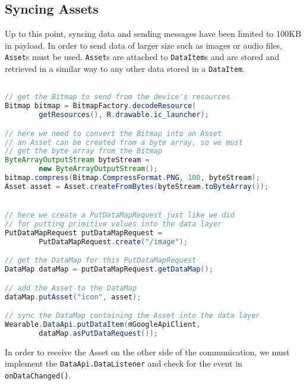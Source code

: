 
\subsection{Syncing Assets}
Up to this point, syncing data and sending messages have been limited to 100KB
in payload. In order to send data of larger size such as images or audio files,
\texttt{Asset}s must be used. \texttt{Asset}s are attached to
\texttt{DataItem}s and are stored and retrieved in a similar way to any other
data stored in a \texttt{DataItem}.

\begin{lstlisting}[language=Java]

// get the Bitmap to send from the device's resources
Bitmap bitmap = BitmapFactory.decodeResource(
        getResources(), R.drawable.ic_launcher);

// here we need to convert the Bitmap into an Asset
// an Asset can be created from a byte array, so we must
// get the byte array from the Bitmap
ByteArrayOutputStream byteStream =
        new ByteArrayOutputStream();
bitmap.compress(Bitmap.CompressFormat.PNG, 100, byteStream);
Asset asset = Asset.createFromBytes(byteStream.toByteArray());


// here we create a PutDataMapRequest just like we did
// for putting primitive values into the data layer
PutDataMapRequest putDataMapRequest =
        PutDataMapRequest.create("/image");

// get the DataMap for this PutDataMapRequest
DataMap dataMap = putDataMapRequest.getDataMap();

// add the Asset to the DataMap
dataMap.putAsset("icon", asset);

// sync the DataMap containing the Asset into the data layer
Wearable.DataApi.putDataItem(mGoogleApiClient,
        dataMap.asPutDataRequest());

\end{lstlisting}

In order to receive the Asset on the other side of the communication, we must
implement the \texttt{DataApi.DataListener} and check for the event in
\texttt{onDataChanged()}.


